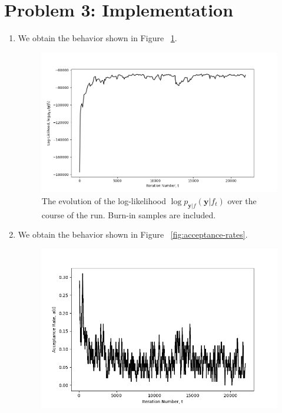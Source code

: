 \documentclass[secnumaric,notitlepage,amsmath,amssymb,nofootinbib,floatfix,12pt]{revtex4-1}
\begin{document}
\section*{Problem 3: Implementation}
\begin{enumerate}[label=(\alph*)]
\item We obtain the behavior shown in Figure ~\ref{fig:log-likelihood}.
\begin{figure}[htb]
\includegraphics[scale=0.7]{../plots/log-likelihood_vs_iteration.png}
\caption{The evolution of the log-likelihood $\log p_{\mathbf{y}|f}(\mathbf{y}|f_t)$ over the course of the run. Burn-in samples are included.}
\label{fig:log-likelihood}
\end{figure}
\item We obtain the behavior shown in Figure ~\ref{fig:acceptance-rates}.
\begin{figure}
\includegraphics[scale=0.7]{../plots/acceptance_rate.png}

\end{figure}
\end{enumerate}
\end{document}
